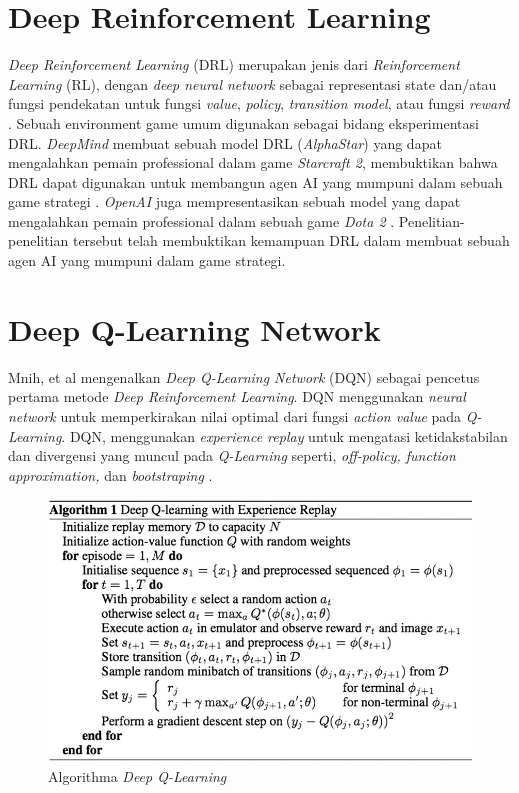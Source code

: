 \section{Deep Reinforcement Learning}
\emph{Deep Reinforcement Learning} (DRL) merupakan jenis dari \emph{Reinforcement Learning} (RL), dengan \emph{deep neural network} sebagai representasi state
dan/atau fungsi pendekatan untuk fungsi \emph{value}, \emph{policy}, \emph{transition model}, atau fungsi \emph{reward} \citep{deepRL}.
Sebuah environment game umum digunakan sebagai bidang eksperimentasi DRL.
\emph{DeepMind} membuat sebuah model DRL (\emph{AlphaStar}) yang dapat mengalahkan pemain professional dalam game \emph{Starcraft 2}, membuktikan bahwa DRL dapat digunakan untuk membangun agen AI yang mumpuni dalam sebuah game strategi \citep{alphaStar}.
\emph{OpenAI} juga mempresentasikan sebuah model yang dapat mengalahkan pemain professional dalam sebuah game \emph{Dota 2} \citep{openaiDota2}.
Penelitian-penelitian tersebut telah membuktikan kemampuan DRL dalam membuat sebuah agen AI yang mumpuni dalam game strategi.

\section{Deep Q-Learning Network}
Mnih, et al mengenalkan \emph{Deep Q-Learning Network} (DQN)\citep{deepQN} sebagai pencetus pertama metode \emph{Deep Reinforcement Learning}. DQN menggunakan \emph{neural network} untuk memperkirakan nilai optimal dari fungsi \emph{action value} pada \emph{Q-Learning}.
DQN, menggunakan \emph{experience replay} untuk mengatasi ketidakstabilan dan divergensi yang muncul pada \emph{Q-Learning} seperti, \emph{off-policy, function approximation,} dan \emph{bootstraping} \citep{deepQNFunction}.

\begin{figure}[H]
  \centering
    \includegraphics[scale=0.35]{gambar/dqn_algorithm.png}
    \caption{Algorithma \emph{Deep Q-Learning}}
    \label{fig:dqnAlgorithm}
\end{figure}

